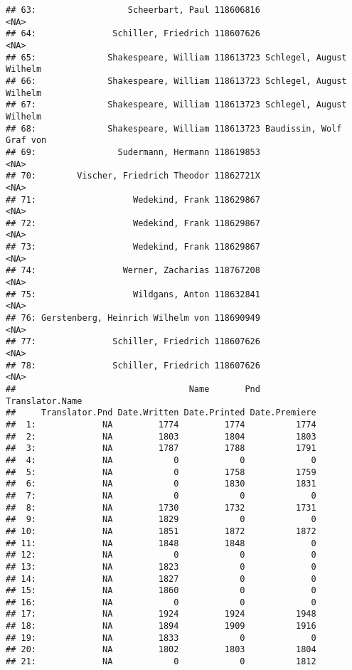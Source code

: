 \documentclass[]{book}
\begin{document}
\begin{verbatim}
## 63:                  Scheerbart, Paul 118606816                     <NA>
## 64:               Schiller, Friedrich 118607626                     <NA>
## 65:              Shakespeare, William 118613723 Schlegel, August Wilhelm
## 66:              Shakespeare, William 118613723 Schlegel, August Wilhelm
## 67:              Shakespeare, William 118613723 Schlegel, August Wilhelm
## 68:              Shakespeare, William 118613723 Baudissin, Wolf Graf von
## 69:                Sudermann, Hermann 118619853                     <NA>
## 70:        Vischer, Friedrich Theodor 11862721X                     <NA>
## 71:                   Wedekind, Frank 118629867                     <NA>
## 72:                   Wedekind, Frank 118629867                     <NA>
## 73:                   Wedekind, Frank 118629867                     <NA>
## 74:                 Werner, Zacharias 118767208                     <NA>
## 75:                   Wildgans, Anton 118632841                     <NA>
## 76: Gerstenberg, Heinrich Wilhelm von 118690949                     <NA>
## 77:               Schiller, Friedrich 118607626                     <NA>
## 78:               Schiller, Friedrich 118607626                     <NA>
##                                  Name       Pnd          Translator.Name
##     Translator.Pnd Date.Written Date.Printed Date.Premiere
##  1:             NA         1774         1774          1774
##  2:             NA         1803         1804          1803
##  3:             NA         1787         1788          1791
##  4:             NA            0            0             0
##  5:             NA            0         1758          1759
##  6:             NA            0         1830          1831
##  7:             NA            0            0             0
##  8:             NA         1730         1732          1731
##  9:             NA         1829            0             0
## 10:             NA         1851         1872          1872
## 11:             NA         1848         1848             0
## 12:             NA            0            0             0
## 13:             NA         1823            0             0
## 14:             NA         1827            0             0
## 15:             NA         1860            0             0
## 16:             NA            0            0             0
## 17:             NA         1924         1924          1948
## 18:             NA         1894         1909          1916
## 19:             NA         1833            0             0
## 20:             NA         1802         1803          1804
## 21:             NA            0            0          1812

\end{verbatim}
\end{document}
